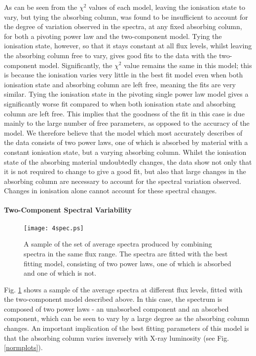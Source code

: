 \documentclass[letters,useAMS,usenatbib]{samnote}
\begin{document}
As can be seen from the $\chi^2$ values of each model, leaving the ionisation state to vary, but tying the absorbing column, was found to be insufficient to account for
the degree of variation observed in the spectra, at any fixed absorbing column, for both a pivoting power law and the two-component model. Tying the ionisation state,
however, so that it stays constant at all flux levels, whilst leaving the absorbing column free to vary, gives good fits to the data with the two-component model.
Significantly, the $\chi^2$ value remains the same in this model; this is because the ionisation varies very little in the best fit model even when both ionisation state
and absorbing column are left free, meaning the fits are very similar. Tying the ionisation state in the pivoting single power law model gives a significantly worse
fit compared to when both ionisation state and absorbing column are left free. This implies that the goodness of the fit in this case is due mainly to the large number
of free parameters, as opposed to the accuracy of the model. We therefore believe that the model which most accurately describes of the data consists of two power
laws, one of which is absorbed by material with a constant ionisation state, but a varying absorbing column. Whilst the ionisation state of the absorbing
material undoubtedly changes, the data show not only that it is not required to change to give a good fit, but also that large changes in the absorbing column are
necessary to account for the spectral variation observed. Changes in ionisation alone cannot account for these spectral changes.


\paragraph{Two-Component Spectral Variability}

\begin{figure}
	\texttt{[image: 4spec.ps]}
	\caption{A sample of the set of average spectra produced by combining 
	spectra in the same flux range. The spectra are fitted with the best fitting model,
	consisting of two power laws, one of which is absorbed and one of which is not.}
	\label{spectra}
\end{figure} 

Fig. \ref{spectra} shows a sample of the average spectra at different flux levels, fitted with the two-component model described above.
In this case, the spectrum is composed of two power laws - an unabsorbed component and an absorbed component, which can be seen to vary by a large degree as the
absorbing column changes. An important implication of the best fitting parameters of this model is that the absorbing column varies inversely with X-ray luminosity (see
Fig. \ref{normplots}). 
\end{document}
